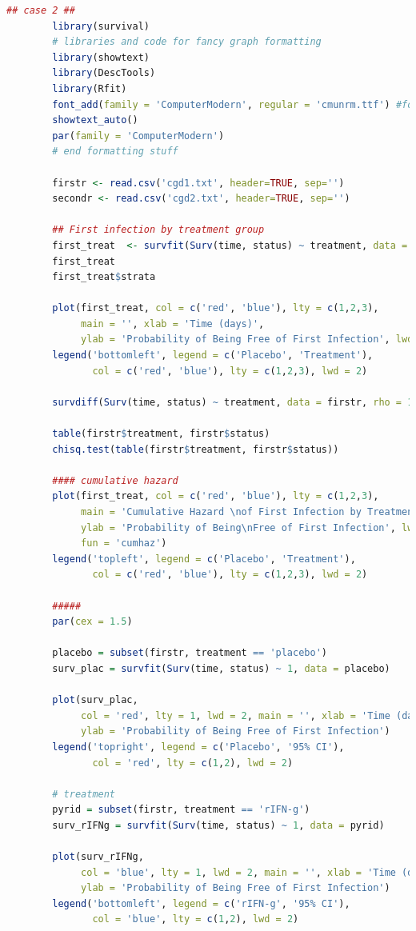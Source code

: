 \documentclass{article}
\begin{document}
	\begin{lstlisting}[language=R, basicstyle=\ttfamily\footnotesize, breaklines=true]
		## case 2 ##
		library(survival)
		# libraries and code for fancy graph formatting
		library(showtext)
		library(DescTools)
		library(Rfit)
		font_add(family = 'ComputerModern', regular = 'cmunrm.ttf') #for consistent formatting in LaTex
		showtext_auto()
		par(family = 'ComputerModern')
		# end formatting stuff
		
		firstr <- read.csv('cgd1.txt', header=TRUE, sep='')
		secondr <- read.csv('cgd2.txt', header=TRUE, sep='')
		
		## First infection by treatment group 
		first_treat  <- survfit(Surv(time, status) ~ treatment, data = firstr)
		first_treat 
		first_treat$strata
		
		plot(first_treat, col = c('red', 'blue'), lty = c(1,2,3), 
			 main = '', xlab = 'Time (days)', 
			 ylab = 'Probability of Being Free of First Infection', lwd = 2)
		legend('bottomleft', legend = c('Placebo', 'Treatment'), 
			   col = c('red', 'blue'), lty = c(1,2,3), lwd = 2)
		
		survdiff(Surv(time, status) ~ treatment, data = firstr, rho = 1)
		
		table(firstr$treatment, firstr$status)
		chisq.test(table(firstr$treatment, firstr$status))
		
		#### cumulative hazard
		plot(first_treat, col = c('red', 'blue'), lty = c(1,2,3), 
			 main = 'Cumulative Hazard \nof First Infection by Treatment', xlab = 'Time (days)',
			 ylab = 'Probability of Being\nFree of First Infection', lwd = 2,
			 fun = 'cumhaz')
		legend('topleft', legend = c('Placebo', 'Treatment'), 
			   col = c('red', 'blue'), lty = c(1,2,3), lwd = 2)
		
		#####
		par(cex = 1.5)
		
		placebo = subset(firstr, treatment == 'placebo')
		surv_plac = survfit(Surv(time, status) ~ 1, data = placebo)
		
		plot(surv_plac, 
			 col = 'red', lty = 1, lwd = 2, main = '', xlab = 'Time (days)', 
			 ylab = 'Probability of Being Free of First Infection')
		legend('topright', legend = c('Placebo', '95% CI'),
			   col = 'red', lty = c(1,2), lwd = 2)
		
		# treatment
		pyrid = subset(firstr, treatment == 'rIFN-g')
		surv_rIFNg = survfit(Surv(time, status) ~ 1, data = pyrid)
		
		plot(surv_rIFNg, 
			 col = 'blue', lty = 1, lwd = 2, main = '', xlab = 'Time (days)', 
			 ylab = 'Probability of Being Free of First Infection')
		legend('bottomleft', legend = c('rIFN-g', '95% CI'),
			   col = 'blue', lty = c(1,2), lwd = 2)
		

\end{lstlisting}
\end{document}
